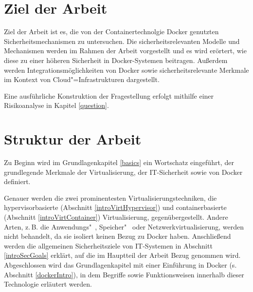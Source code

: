 \documentclass[../main.tex]{subfiles}
\begin{document}


  \section{Ziel der Arbeit}
    Ziel der Arbeit ist es, die von der Containertechnolgie Docker genutzten Sicherheitsmechanismen zu untersuchen. Die sicherheitsrelevanten Modelle und Mechanismen werden im Rahmen der Arbeit vorgestellt und es wird erörtert, wie diese zu einer höheren Sicherheit in Docker-Systemen beitragen.
    Außerdem werden Integrationsmöglichkeiten von Docker sowie sicherheitsrelevante Merkmale im Kontext von Cloud"=Infrastrukturen dargestellt.

    Eine ausführliche Konstruktion der Fragestellung erfolgt mithilfe einer Risikoanalyse in Kapitel \ref{question}.

  \section{Struktur der Arbeit}
    Zu Beginn wird im Grundlagenkapitel \ref{basics} ein Wortschatz eingeführt, der grundlegende Merkmale der Virtualisierung, der IT-Sicherheit sowie von Docker definiert.

    Genauer werden die zwei prominentesten Virtualisierungstechniken, die hypervisorbasierte (Abschnitt \ref{introVirtHypervisor}) und containerbasierte (Abschnitt \ref{introVirtContainer}) Virtualisierung, gegenübergestellt. Andere Arten, z.\,B. die Anwendungs"~, Spei\-cher"~ oder Netzwerkvirtualisierung, werden nicht behandelt, da sie isoliert keinen Bezug zu Docker haben.  %
    Anschließend werden die allgemeinen Sicherheitsziele von \acrshort{IT}-Systemen in Abschnitt \ref{introSecGoals} erklärt, auf die im Hauptteil der Arbeit Bezug genommen wird. Abgeschlossen wird das Grundlagenkapitel mit einer Einführung in Docker (s. Abschnitt \ref{dockerIntro}), in dem Begriffe sowie Funktionsweisen innerhalb dieser Technologie erläutert werden.
\end{document}
